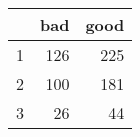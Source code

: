 \begin{table}[ht]
\centering
\begin{tabular}{rrr}
  \hline
 & bad & good \\ 
  \hline
1 & 126 & 225 \\ 
  2 & 100 & 181 \\ 
  3 &  26 &  44 \\ 
   \hline
\end{tabular}
\end{table}
